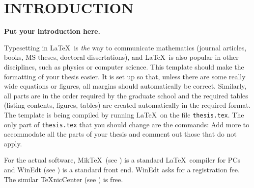 
\chapter{INTRODUCTION}\label{chap1:introduction}

{\bf Put your introduction here.}


Typesetting in \LaTeX \ is {\em the} way to communicate mathematics
(journal articles, books, MS theses, doctoral dissertations),
and \LaTeX \ is also popular in other disciplines, such as 
physics or computer science. This template should make the formatting
of your thesis easier. It is set up so that, unless there are some really
wide equations or figures, all margins should automatically be correct.
Similarly, all parts are in the order required by the graduate school and 
the required tables (listing contents, figures, tables)
are created automatically in the required format. 
The template is being compiled by running \LaTeX \ on 
the file \verb+thesis.tex+. The only part of 
\verb+thesis.tex+ that you should change are the
\verb++ commands: Add more to accommodate all the
parts of your thesis and comment out those that do not apply. 


For the actual software, Mik\TeX \ (see \cite{MiKTeX})
is a standard \LaTeX \ compiler for PCs and
WinEdt (see \cite{WinEdt}) is a standard front end.
WinEdt asks for a registration fee. 
The similar \TeX nicCenter (see \cite{TeXnicCenter})
is free. 


